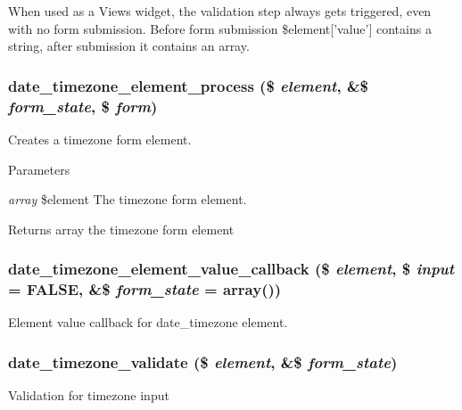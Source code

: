 When used as a Views widget, the validation step always gets triggered, even with no form submission. Before form submission \$element\mbox{[}'value'\mbox{]} contains a string, after submission it contains an array. \hypertarget{date__api__elements_8inc_ac45026ff7ec5ee2113dbbeec0a079aa5}{
\subsubsection[{date\_\-timezone\_\-element\_\-process}]{\setlength{\rightskip}{0pt plus 5cm}date\_\-timezone\_\-element\_\-process (\$ {\em element}, \/  \&\$ {\em form\_\-state}, \/  \$ {\em form})}}
\label{date__api__elements_8inc_ac45026ff7ec5ee2113dbbeec0a079aa5}
Creates a timezone form element.


\begin{DoxyParams}{Parameters}
\item[{\em array}]\$element The timezone form element.\end{DoxyParams}
\begin{DoxyReturn}{Returns}
array the timezone form element 
\end{DoxyReturn}
\hypertarget{date__api__elements_8inc_a551fafa7951b2fb425465e4a668ef078}{
\subsubsection[{date\_\-timezone\_\-element\_\-value\_\-callback}]{\setlength{\rightskip}{0pt plus 5cm}date\_\-timezone\_\-element\_\-value\_\-callback (\$ {\em element}, \/  \$ {\em input} = {\ttfamily FALSE}, \/  \&\$ {\em form\_\-state} = {\ttfamily array()})}}
\label{date__api__elements_8inc_a551fafa7951b2fb425465e4a668ef078}
Element value callback for date\_\-timezone element. \hypertarget{date__api__elements_8inc_a407096cd20b66a684641e1617178619c}{
\subsubsection[{date\_\-timezone\_\-validate}]{\setlength{\rightskip}{0pt plus 5cm}date\_\-timezone\_\-validate (\$ {\em element}, \/  \&\$ {\em form\_\-state})}}
\label{date__api__elements_8inc_a407096cd20b66a684641e1617178619c}
Validation for timezone input

